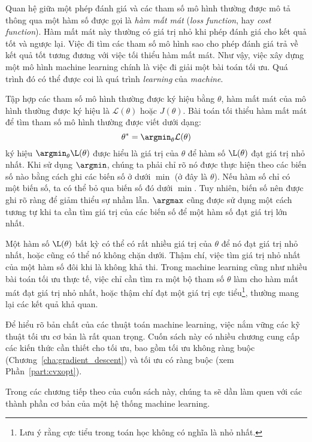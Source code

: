 Quan hệ giữa một phép đánh giá và các tham số mô hình thường được mô tả thông
qua một hàm số được gọi là \textit{hàm mất mát} (\textit{loss function},
hay \textit{cost function}). Hàm mất mát này thường có giá trị nhỏ khi phép
đánh giá cho kết quả tốt và ngược lại. Việc đi tìm các tham số mô hình sao cho
phép đánh giá trả về kết quả tốt tương đương với việc tối thiểu hàm mất mát.
Như vậy, việc xây dựng một mô hình machine learning chính là việc đi giải một
bài toán tối ưu. Quá trình đó có thể được coi là quá trình
\textit{learning} của \textit{machine}. 

Tập hợp các tham số mô hình thường được ký hiệu bằng $\theta$, hàm mất mát của
mô hình thường được ký hiệu là $\mathcal{L}(\theta)$ hoặc $J(\theta)$. Bài
toán tối thiểu hàm mất mát để tìm tham số mô hình thường được viết dưới dạng:
\begin{equation}
    \theta^* = \argmin_{\theta}\mathcal{L}(\theta)
\end{equation}
ký hiệu $\displaystyle \argmin_{\theta}\L(\theta)$ được hiểu là giá trị của
$\theta$ để hàm số
$\L(\theta)$ đạt giá trị nhỏ nhất. Khi sử dụng $\argmin$, chúng ta phải
chỉ rõ nó được thực hiện theo các biến số nào bằng cách ghi các biến số ở dưới
$\min$ (ở đây là $\theta$). Nếu hàm số chỉ có một biến số, ta có thể bỏ qua
biến số đó dưới $\min$. Tuy nhiên, biến số nên được ghi rõ ràng để giảm
thiểu sự nhầm lẫn. $\argmax$ cũng được sử dụng một cách tương tự khi ta cần
tìm giá trị của các biến số để một hàm số đạt giá trị lớn nhất. 

Một hàm số $\L(\theta)$ bất kỳ có thể có rất nhiều giá trị của $\theta$ để nó
đạt giá trị nhỏ nhất, hoặc cũng có thể nó không chặn dưới. Thậm chí, việc tìm
giá trị nhỏ nhất của một hàm số đôi khi là không khả thi. Trong machine learning
cũng như nhiều bài toán tối ưu thực tế, việc chỉ cần tìm ra một bộ tham số
$\theta$ làm cho hàm mất mát đạt giá trị nhỏ nhất, hoặc thậm chí đạt một giá
trị cực tiểu\footnote{Lưu ý rằng cực tiểu trong toán học không có nghĩa là nhỏ
nhất.}, thường mang lại các kết quả khả quan. 

Để hiểu rõ bản chất của các thuật toán machine learning, việc nắm vững các kỹ
thuật tối ưu cơ bản là rất quan trọng. Cuốn sách này có nhiều chương cung cấp
các kiến thức cần thiết cho tối ưu, bao gồm tối ưu không ràng buộc
(Chương~\ref{cha:gradient_descent}) và tối ưu có ràng buộc (xem
Phần~\ref{part:cvxopt}). 

Trong các chương tiếp theo của cuốn sách này, chúng ta sẽ dần làm quen với các
thành phần cơ bản của một hệ thống machine learning. 

